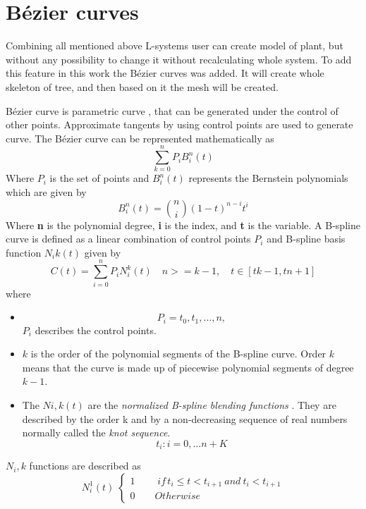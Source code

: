\documentclass[b5paper,twoside,11pt]{article}
\begin{document}
\section{Bézier curves}

Combining all mentioned above L-systems user can create model of plant, but without any possibility to change it without recalculating whole system. To add this feature in this work the Bézier curves was added. It will create whole skeleton of tree, and then based on it the mesh will be created.

Bézier curve is parametric curve \cite{BSpline}, that can be generated under the control of other points. Approximate tangents by using control points are used to generate curve. The Bézier curve can be represented mathematically as
\begin{equation}
\sum\limits_{k=0}^n P_i B_{i}^{n}(t)
\end{equation}
Where $P_i$ is the set of points and $B_{i}^{n}(t)$ represents the Bernstein polynomials which are given by 
\begin{equation}
B_{i}^{n}(t)=\binom{n}{i}(1-t)^{n-i}t^{i}
\end{equation}
Where \textbf{n} is the polynomial degree, \textbf{i} is the index, and \textbf{t} is the variable.
\newline
A B-spline curve is defined as a linear combination of control points $P_i$ and B-spline basis function $N_i	 k (t)$ given by
  \begin{equation}
  C(t)=\sum\limits_{i=0}^n P_i N_{i}^{k}(t)\quad n>=k-1, \quad t \in [tk-1,tn+1]
  \end{equation}
where
\begin{itemize}
\item \begin{equation}\label{conPoi}
P_i={t_0,t_1,\ldots,n},
\end{equation}
$P_i$ describes the control points.
\item $k$ is the order of the polynomial segments of the B-spline curve. Order ${k}$ means that the curve is made up of piecewise polynomial segments of degree $k - 1$.
\item The $Ni,k(t)$ are the \textit{normalized B-spline blending functions} . They are described by the order k and by a non-decreasing sequence of real numbers normally called the \textit{knot sequence}.
\begin{equation}
t_i:i={0,\ldots n+K}
\end{equation}
\end{itemize}
$N_i, k$ functions are described as 
\begin{equation} N_{i}^{1}(t)\;
\begin{cases} 1\qquad \;if \, t_i\leq t< t_{i+1}\:and\: t_i<t_{i+1} \\ 
0 \qquad   Otherwise
 \end{cases}
  \end{equation}
  
\end{document}
